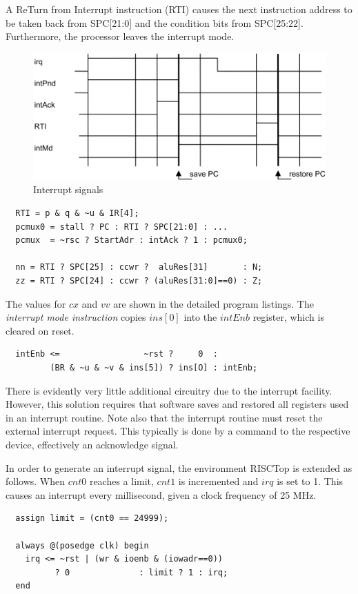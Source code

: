 A ReTurn from Interrupt instruction (RTI) causes the next instruction address to be taken back from
SPC[21:0] and the condition bits from SPC[25:22]. Furthermore, the processor leaves the interrupt
mode.
\begin{figure}[h!]
  \centering
  \includegraphics[width=.9\textwidth]{i/0.png}
  \caption{Interrupt signals}
  \label{fig:is}
\end{figure}
\begin{verbatim}
  RTI = p & q & ~u & IR[4];
  pcmux0 = stall ? PC : RTI ? SPC[21:0] : ...
  pcmux  = ~rsc ? StartAdr : intAck ? 1 : pcmux0;
 
  nn = RTI ? SPC[25] : ccwr ?  aluRes[31]       : N;
  zz = RTI ? SPC[24] : ccwr ? (aluRes[31:0]==0) : Z;
\end{verbatim}

The values for $cx$ and $vv$ are shown in the detailed program listings. The \emph{interrupt mode
instruction} copies $ins[0]$ into the $intEnb$ register, which is cleared on reset.
\begin{verbatim}
  intEnb <=                 ~rst ?     0  :
         (BR & ~u & ~v & ins[5]) ? ins[O] : intEnb;
\end{verbatim}

There is evidently very little additional circuitry due to the interrupt facility. However, this
solution requires that software saves and restored all registers used in an interrupt routine. Note
also that the interrupt routine must reset the external interrupt request. This typically is done by
a command to the respective device, effectively an acknowledge signal.

In order to generate an interrupt signal, the environment RISCTop is extended as follows. When
$cnt0$ reaches a limit, $cnt1$ is incremented and $irq$ is set to 1. This causes an interrupt every
millisecond, given a clock frequency of 25 MHz.
\begin{verbatim}
  assign limit = (cnt0 == 24999);
 
  always @(posedge clk) begin
    irq <= ~rst | (wr & ioenb & (iowadr==0))
          ? 0              : limit ? 1 : irq;
  end
\end{verbatim}
